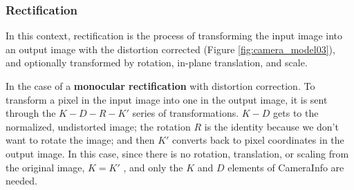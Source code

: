 \subsubsection{Rectification}
In this context, rectification is the process of transforming the input image into an output image with the distortion corrected (Figure \ref{fig:camera_model03}), and optionally transformed by rotation, in-plane translation, and scale.

In the case of a \textbf{monocular rectification} with distortion correction. To transform a pixel in the input image into one in the output image, it is sent through the $K - D - R - K'$ series of transformations. $K - D$ gets to the normalized, undistorted image; the rotation $R$ is the identity because we don't want to rotate the image; and then $K'$ converts back to pixel coordinates in the output image. In this case, since there is no rotation, translation, or scaling from the original image, $K = K'$ , and only the $K$ and $D$ elements of CameraInfo are needed.

